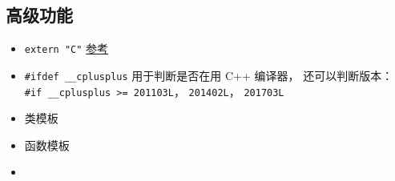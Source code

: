 \subsection{高级功能}
\begin{itemize}
\item \verb`extern "C"` \href{https://www.geeksforgeeks.org/extern-c-in-c/}{参考}
\item \verb`#ifdef __cplusplus` 用于判断是否在用 C++ 编译器， 还可以判断版本： \verb`#if __cplusplus >= 201103L`， \verb`201402L`， \verb`201703L`
\item 类模板
\item 函数模板
\item {}
\end{itemize}
